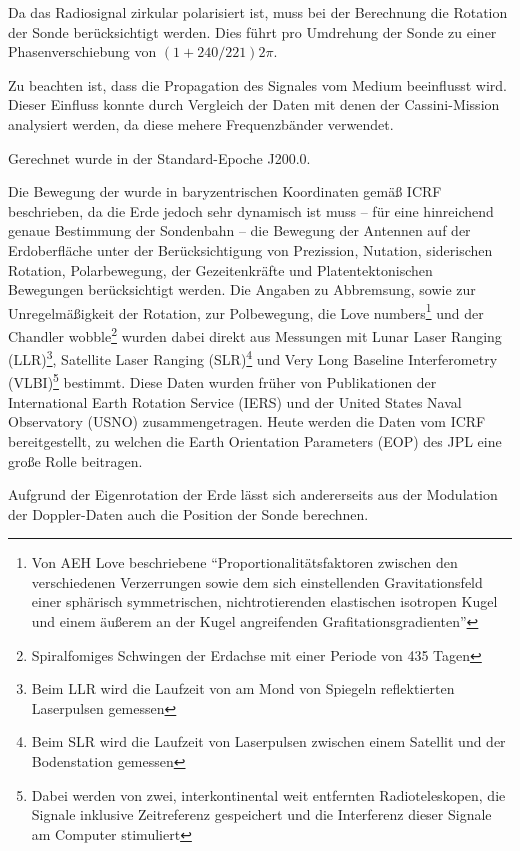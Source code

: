 Da das Radiosignal zirkular polarisiert ist, muss bei der Berechnung die Rotation der Sonde berücksichtigt werden.
Dies führt pro Umdrehung der Sonde zu einer Phasenverschiebung von $(1+240/221) 2\pi$. %

Zu beachten ist, dass die Propagation des Signales vom Medium beeinflusst wird. Dieser Einfluss konnte durch Vergleich
der Daten mit denen der Cassini-Mission analysiert werden, da diese mehere Frequenzbänder verwendet.\cite{Dittus2006} %

Gerechnet wurde in der Standard-Epoche J200.0. %

Die Bewegung der wurde in baryzentrischen Koordinaten gemäß ICRF beschrieben, %
da die Erde jedoch sehr dynamisch ist muss – für eine hinreichend genaue Bestimmung der Sondenbahn –
die Bewegung der Antennen auf der Erdoberfläche unter der Berücksichtigung von Prezission, Nutation,
siderischen Rotation, Polarbewegung, der Gezeitenkräfte und Platentektonischen Bewegungen berücksichtigt werden.
Die Angaben zu Abbremsung, sowie zur Unregelmäßigkeit der Rotation, zur Polbewegung, die Love numbers\footnote{Von AEH
Love beschriebene ``Proportionalitätsfaktoren zwischen den verschiedenen Verzerrungen sowie dem sich einstellenden
Gravitationsfeld einer sphärisch symmetrischen, nichtrotierenden elastischen isotropen Kugel und einem äußerem an der
Kugel angreifenden Grafitationsgradienten''\cite{Dittus2006}} und der Chandler wobble\footnote{Spiralfomiges Schwingen
der Erdachse mit einer Periode von 435 Tagen} %
wurden dabei direkt aus Messungen mit Lunar Laser Ranging (LLR)\footnote{Beim LLR wird die Laufzeit von am Mond von
Spiegeln reflektierten Laserpulsen gemessen}, Satellite Laser Ranging (SLR)\footnote{Beim SLR wird die Laufzeit von
Laserpulsen zwischen einem Satellit und der Bodenstation gemessen} und Very Long Baseline Interferometry
(VLBI)\footnote{Dabei werden von zwei, interkontinental weit entfernten Radioteleskopen, die Signale inklusive
Zeitreferenz gespeichert und die Interferenz dieser Signale am Computer stimuliert} bestimmt.
Diese Daten wurden früher von Publikationen der International Earth Rotation Service (IERS) und der United States Naval Observatory (USNO) zusammengetragen. Heute werden die Daten vom ICRF bereitgestellt, zu welchen die Earth Orientation Parameters
(EOP) des JPL eine große Rolle beitragen.\cite{Anderson2002}

Aufgrund der Eigenrotation der Erde lässt sich andererseits aus der Modulation der  Doppler-Daten auch die
Position der Sonde berechnen. %

